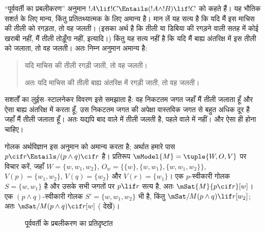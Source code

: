 \documentclass[../../../include/open-logic-section]{subfiles}
\begin{document}


``पूर्ववर्ती का प्रबलीकरण'' अनुमान
$!A \lif !C \Entails (!A \land !B) \lif !C$ को कहते हैं। यह भौतिक सशर्त
के लिए मान्य, किंतु प्रतितथ्यात्मक के लिए अमान्य है। मान लें यह सत्य है कि
यदि मैं इस माचिस की तीली को रगड़ता, तो वह जलती। (इसका अर्थ है कि तीली या
डिबिया की रगड़ने वाली सतह में कोई खराबी नहीं, मैं तीली तोड़ूँगा नहीं,
इत्यादि।) किंतु यह सत्य नहीं है कि यदि मैं बाह्य अंतरिक्ष में इस तीली को
जलाता, तो वह जलती। अतः निम्न अनुमान अमान्य है:
\begin{quote}
  यदि माचिस की तीली रगड़ी जाती, तो वह जलती।

  अतः यदि माचिस की तीली बाह्य अंतरिक्ष में रगड़ी जाती, तो वह जलती।
\end{quote}

सशर्तों का लुईस--स्टालनेकर विवरण इसे समझाता है: वह निकटतम जगत जहाँ मैं तीली
जलाता हूँ और ऐसा बाह्य अंतरिक्ष में करता हूँ, उस निकटतम जगत की अपेक्षा
वास्तविक जगत से बहुत अधिक दूर है जहाँ मैं तीली जलाता हूँ। अतः यद्यपि बाद
वाले में तीली जलती है, पहले वाले में नहीं। और ऐसा ही होना चाहिए।

\begin{ex}
  गोलक अर्थविज्ञान इस अनुमान को अमान्य करता है; अर्थात हमारे पास
  $p \cif r \Entails/ (p \land q) \cif r$ है। प्रतिरूप
  $\mModel{M} = \tuple{W, O, V}$ पर विचार करें, जहाँ
  $W = \{w, w_1, w_2\}$,
  $O_w = \{\{w\}, \{w, w_1\}, \{w, w_1, w_2\}\}$,
  $V(p) = \{w_1, w_2\}$, $V(q) = \{w_2\}$ और $V(r) = \{w_1\}$। एक
  $p$-स्वीकारी गोलक $S = \{w, w_1\}$ है और उसके सभी जगतों पर
  $p \lif r$ सत्य है, अतः $\mSat{M}{p \cif r}[w]$। एक
  $(p \land q)$-स्वीकारी गोलक $S' = \{w, w_1, w_2\}$ भी है, किंतु
  $\mSat/{M}{(p \land q) \lif r}[w_2]$; अतः
  $\mSat/{M}{(p \land q) \cif r}[w]$
  ( देखें)।

\begin{figure}
\begin{center}
\caption{पूर्ववर्ती के प्रबलीकरण का प्रतिदृष्टांत}
\end{center}
\end{figure}
\end{ex}
\end{document}
